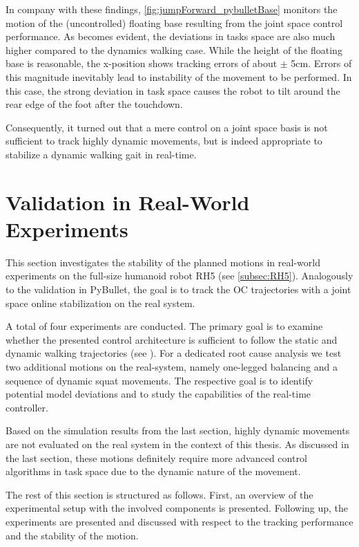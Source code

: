 In company with these findings, \cref{fig:jumpForward_pybulletBase} monitors the motion of the (uncontrolled) floating base resulting from the joint space control performance. As becomes evident, the deviations in tasks space are also much higher compared to the dynamics walking case. While the height of the floating base is reasonable, the x-position shows tracking errors of about $\pm$ 5cm. Errors of this magnitude inevitably lead to instability of the movement to be performed. In this case, the strong deviation in task space causes the robot to tilt around the rear edge of the foot after the touchdown. 

Consequently, it turned out that a mere control on a joint space basis is not sufficient to track highly dynamic movements, but is indeed appropriate to stabilize a dynamic walking gait in real-time. 


\section{Validation in Real-World Experiments}\label{sec:OnlineExperiments}
This section investigates the stability of the planned motions in real-world experiments on the full-size humanoid robot RH5 (see \cref{subsec:RH5}). Analogously to the validation in PyBullet, the goal is to track the \gls{OC} trajectories with a joint space online stabilization on the real system. 

A total of four experiments are conducted. The primary goal is to examine whether the presented control architecture is sufficient to follow the static and dynamic walking trajectories (see ). For a dedicated root cause analysis we test two additional motions on the real-system, namely one-legged balancing and a sequence of dynamic squat movements. The respective goal is to identify potential model deviations and to study the capabilities of the real-time controller.

Based on the simulation results from the last section, highly dynamic movements are not evaluated on the real system in the context of this thesis. As discussed in the last section, these motions definitely require more advanced control algorithms in task space due to the dynamic nature of the movement. 

The rest of this section is structured as follows. First, an overview of the experimental setup with the involved components is presented. Following up, the experiments are presented and discussed with respect to the tracking performance and the stability of the motion.

